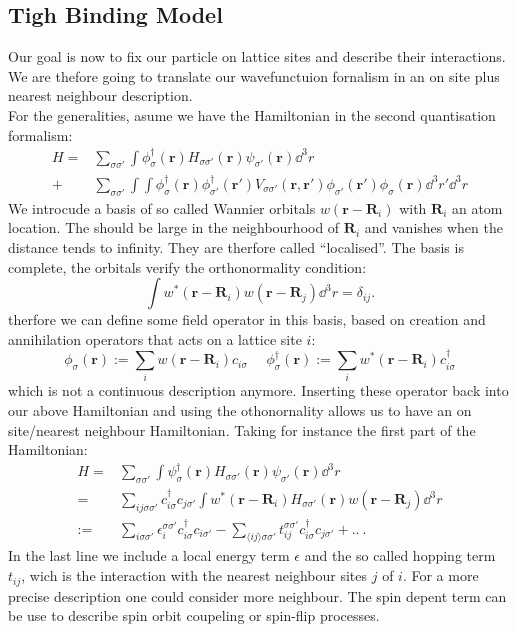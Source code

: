 \documentclass[../main.tex]{subfile}
\begin{document}
\subsection{Tigh Binding Model}
Our goal is now to fix our particle on lattice sites and describe their interactions. We are thefore going to translate our wavefunctuion fornalism in an on site plus
nearest neighbour description.\\

For the generalities, asume we have the Hamiltonian in the second quantisation formalism:
\begin{align*}
    H = & \sum_{\sigma\sigma'} \int \phi_{\sigma}^{\dagger}(\bm{r}) H_{\sigma\sigma'}(\bm{r}) \psi_{\sigma'}(\bm{r}) \dd^3r\\
    + & \sum_{\sigma\sigma'} \int \int \phi_{\sigma}^{\dagger}(\bm{r})\phi_{\sigma'}^{\dagger}(\bm{r}') V_{\sigma\sigma'}(\bm{r},\bm{r}') \phi_{\sigma'}(\bm{r}')\phi_{\sigma}(\bm{r}) \dd^3r'\dd^3r 
\end{align*}
We introcude a basis of so called Wannier orbitals $w(\bm{r} - \bm{R}_i)$ with $\bm{R}_i$ an atom location. The should be large in the neighbourhood of $\bm{R}_i$ and vanishes when the distance tends to infinity.
They are therfore called ``localised''. The basis is complete, the orbitals verify the orthonormality condition:
\[
    \int w^{\ast}(\bm{r} - \bm{R}_i) w(\bm{r} - \bm{R}_j) \dd^3r = \delta_{ij}.
\]
therfore we can define some field operator in this basis, based on creation and annihilation operators that acts on a lattice site $i$:
\begin{equation}\label{eq:Wannier_fieldOp}
    \phi_{\sigma}(\bm{r}) := \sum_{i} w(\bm{r} - \bm{R}_i) c_{i\sigma} ~~~~~~ \phi_{\sigma}^{\dagger}(\bm{r}) := \sum_{i} w^{\ast}(\bm{r} - \bm{R}_i) c_{i\sigma}^{\dagger}
\end{equation}
which is not a continuous description anymore. 
Inserting these operator back into our above Hamiltonian and using the othonornality allows us to have an on site/nearest neighbour Hamiltonian. Taking for
instance the first part of the Hamiltonian:
\begin{align*}
    H = & \sum_{\sigma\sigma'} \int \psi_{\sigma}^{\dagger}(\bm{r}) H_{\sigma\sigma'}(\bm{r}) \psi_{\sigma'}(\bm{r}) \dd^3r\\
    =& \sum_{ij\sigma\sigma'} c_{i\sigma}^{\dagger} c_{j\sigma'}\int w^{\ast}(\bm{r} - \bm{R}_i) H_{\sigma\sigma'}(\bm{r}) w(\bm{r} - \bm{R}_j) \dd^3r\\
    := & \sum_{i\sigma\sigma'} \epsilon_i^{\sigma\sigma'} c_{i\sigma}^{\dagger} c_{i\sigma'} - \sum_{\langle ij\rangle\sigma\sigma'} t_{ij}^{\sigma\sigma'} c_{i\sigma}^{\dagger} c_{j\sigma'} + ..~.   
\end{align*}
In the last line we include a local energy term $\epsilon$ and the so called hopping term $t_{ij}$, wich is the interaction with the nearest neighbour sites $j$ of $i$.
For a more precise description one could consider more neighbour. The spin depent term can be use to describe spin orbit coupeling or spin-flip processes.\\
\end{document}

